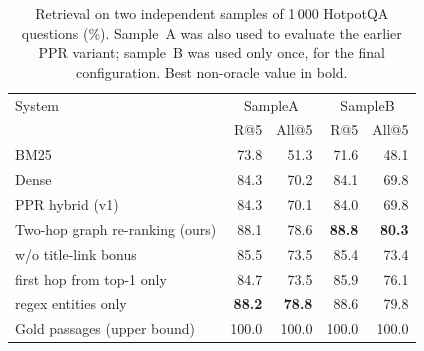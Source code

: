 \begin{table}[t]
\centering
\small
\caption{Retrieval on two independent samples of 1\,000 HotpotQA questions (\%). Sample~A was also used to evaluate the earlier PPR variant; sample~B was used only once, for the final configuration. Best non-oracle value in bold.}
\label{tab:retr2}
\begin{tabular}{lrrrr}
\toprule
System & \multicolumn{2}{c}{SampleA} & \multicolumn{2}{c}{SampleB} \\
& R@5 & All@5 & R@5 & All@5 \\
\midrule
BM25 & 73.8 & 51.3 & 71.6 & 48.1 \\
Dense & 84.3 & 70.2 & 84.1 & 69.8 \\
PPR hybrid (v1) & 84.3 & 70.1 & 84.0 & 69.8 \\
Two-hop graph re-ranking (ours) & 88.1 & 78.6 & \textbf{88.8} & \textbf{80.3} \\
w/o title-link bonus & 85.5 & 73.5 & 85.4 & 73.4 \\
first hop from top-1 only & 84.7 & 73.5 & 85.9 & 76.1 \\
regex entities only & \textbf{88.2} & \textbf{78.8} & 88.6 & 79.8 \\
Gold passages (upper bound) & 100.0 & 100.0 & 100.0 & 100.0 \\
\bottomrule
\end{tabular}
\end{table}